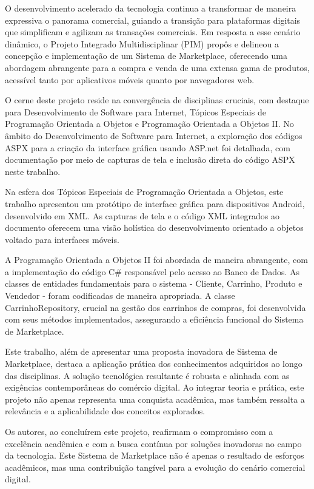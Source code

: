 \documentclass[
	12pt,				%
	openright,			%
	twoside,			%
	a4paper,			%
	english,			%
	brazil				%
	]{abntex2}
\begin{document}
O desenvolvimento acelerado da tecnologia continua a transformar de maneira expressiva o panorama comercial, guiando a transição para plataformas digitais que simplificam e agilizam as transações comerciais. Em resposta a esse cenário dinâmico, o Projeto Integrado Multidisciplinar (PIM) propôs e delineou a concepção e implementação de um Sistema de Marketplace, oferecendo uma abordagem abrangente para a compra e venda de uma extensa gama de produtos, acessível tanto por aplicativos móveis quanto por navegadores web.

O cerne deste projeto reside na convergência de disciplinas cruciais, com destaque para Desenvolvimento de Software para Internet, Tópicos Especiais de Programação Orientada a Objetos e Programação Orientada a Objetos II. No âmbito do Desenvolvimento de Software para Internet, a exploração dos códigos ASPX para a criação da interface gráfica usando ASP.net foi detalhada, com documentação por meio de capturas de tela e inclusão direta do código ASPX neste trabalho.

Na esfera dos Tópicos Especiais de Programação Orientada a Objetos, este trabalho apresentou um protótipo de interface gráfica para dispositivos Android, desenvolvido em XML. As capturas de tela e o código XML integrados ao documento oferecem uma visão holística do desenvolvimento orientado a objetos voltado para interfaces móveis.

A Programação Orientada a Objetos II foi abordada de maneira abrangente, com a implementação do código C# responsável pelo acesso ao Banco de Dados. As classes de entidades fundamentais para o sistema - Cliente, Carrinho, Produto e Vendedor - foram codificadas de maneira apropriada. A classe CarrinhoRepository, crucial na gestão dos carrinhos de compras, foi desenvolvida com seus métodos implementados, assegurando a eficiência funcional do Sistema de Marketplace.

Este trabalho, além de apresentar uma proposta inovadora de Sistema de Marketplace, destaca a aplicação prática dos conhecimentos adquiridos ao longo das disciplinas. A solução tecnológica resultante é robusta e alinhada com as exigências contemporâneas do comércio digital. Ao integrar teoria e prática, este projeto não apenas representa uma conquista acadêmica, mas também ressalta a relevância e a aplicabilidade dos conceitos explorados.

Os autores, ao concluírem este projeto, reafirmam o compromisso com a excelência acadêmica e com a busca contínua por soluções inovadoras no campo da tecnologia. Este Sistema de Marketplace não é apenas o resultado de esforços acadêmicos, mas uma contribuição tangível para a evolução do cenário comercial digital.
\end{document}

